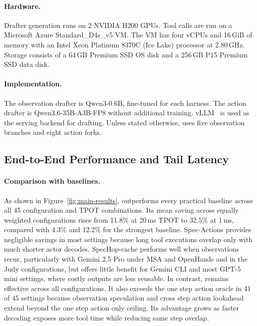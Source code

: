 \paragraph{Hardware.}
Drafter generation runs on 2 NVIDIA H200 GPUs.
Tool calls are run on a Microsoft Azure Standard\_D4s\_v5 VM.
The VM has four vCPUs and 16\,GiB of memory with an Intel Xeon Platinum 8370C (Ice Lake) processor at 2.80\,GHz. Storage consists of a 64\,GB Premium SSD OS disk and a 256\,GB P15 Premium SSD data disk.

\paragraph{Implementation.}
The observation drafter is Qwen3-0.6B, fine-tuned for each harness.
The action drafter is Qwen3.6-35B-A3B-FP8 without additional training.
vLLM~\citep{kwon2023efficient} is used as the serving backend for drafting.
Unless stated otherwise, \sysname{} uses five observation branches and eight action forks.

\subsection{End-to-End Performance and Tail Latency}

\paragraph{Comparison with baselines.}
As shown in Figure~\ref{fig:main-results}, \sysname{} outperforms every
practical baseline across all 45 configuration and TPOT combinations. Its
mean saving across equally weighted configurations rises from 11.8\% at
20\,ms TPOT to 32.5\% at 1\,ms, compared with 4.3\% and 12.2\% for the
strongest baseline. Spec-Actions provides negligible savings in most
settings because long tool executions overlap only with much shorter actor
decodes. SpecHop-cache performs well when observations recur, particularly
with Gemini 2.5 Pro under MSA and OpenHands and in the Judy configurations,
but offers little benefit for Gemini CLI and most GPT-5 mini settings, where
costly outputs are less reusable. In contrast, \sysname{} remains effective
across all configurations. It also exceeds the one step action oracle in 41
of 45 settings because observation speculation and cross step action
lookahead extend beyond the one step action only ceiling. Its advantage grows
as faster decoding exposes more tool time while reducing same step overlap.


